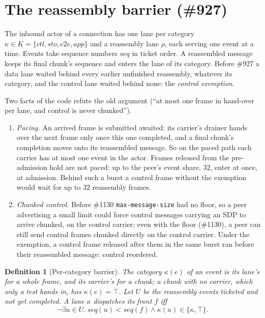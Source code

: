\documentclass[journal]{IEEEtran}
\newtheorem{definition}{Definition}
\newcommand{\issue}[1]{\#{#1}}
\begin{document}
\section{The reassembly barrier (\issue{927})}\label{sec:barrier}

The inbound actor of a connection has one lane per category $\kappa\in K=\{\mathit{ctl},
\mathit{sto},\mathit{e2e},\mathit{app}\}$ and a reassembly lane $\rho$, each serving one event
at a time.  Events take sequence numbers $\mathit{seq}$ in ticket order.  A reassembled message
keeps its final chunk's sequence and enters the lane of its category.  Before \issue{927} a data
lane waited behind every earlier unfinished reassembly, whatever its category, and the control
lane waited behind none: the \emph{control exemption}.

Two facts of the code refute the old argument (``at most one frame in hand-over per lane, and
control is never chunked'').
\begin{enumerate}[leftmargin=1.5em]
\item \emph{Pacing.}  An arrived frame is submitted awaited: its carrier's drainer hands over the
next frame only once this one completed, and a final chunk's completion moves onto its
reassembled message.  So on the paced path each carrier has at most one event in the actor.
Frames released from the pre-admission hold are not paced: up to the peer's event share,
$32$, enter at once, at admission.  Behind such a burst a control frame without the exemption
would wait for up to $32$ reassembly frames.
\item \emph{Chunked control.}  Before \issue{1130} \texttt{max-message-size} had no floor, so a
peer advertising a small limit could force control messages carrying an SDP to arrive chunked,
on the control carrier; even with the floor (\issue{1130}), a peer can still send control frames
chunked directly on the control carrier.  Under the exemption, a control frame released after
them in the same burst ran before their reassembled message: control reordered.
\end{enumerate}

\begin{definition}[Per-category barrier]\label{def:barrier}
The category $\kappa(e)$ of an event is its lane's for a whole frame, and its carrier's for a
chunk; a chunk with no carrier, which only a test hands in, has $\kappa(e)=\top$.  Let $U$ be
the reassembly events ticketed and not yet completed.  A lane $\kappa$ dispatches its front $f$
iff
\[
\neg\exists u\in U.\;\mathit{seq}(u)<\mathit{seq}(f)\wedge\kappa(u)\in\{\kappa,\top\}.
\]
\end{definition}
\end{document}
